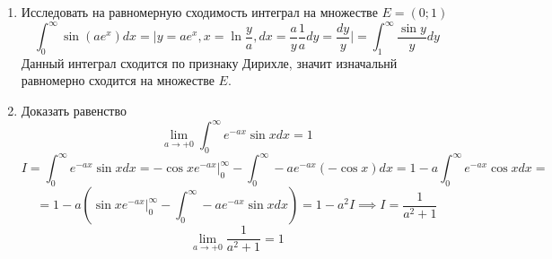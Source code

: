 \documentclass{article}
\begin{document}
\begin{large}
\begin{enumerate}
\item Исследовать на равномерную сходимость интеграл на множестве $ E = (0; 1)$
$$ \int_0^\infty \sin (ae^x) dx = \Big| y = ae^x, x = \ln \frac{y}{a}, dx = \frac{a}{y} \frac{1}{a} dy = \frac{dy}{y} \Big| = \int_1^\infty \frac{\sin y}{y} dy $$
Данный интеграл сходится по признаку Дирихле, значит изначальнй равномерно сходится на множестве $E$.

\item Доказать равенство
$$ \lim_{a \to +0} \int_0^\infty e^{-ax} \sin x dx = 1 $$
$$ I = \int_0^\infty e^{-ax} \sin x dx = -\cos x e^{-ax} \Big|_0^\infty - \int_0^\infty -a e^{-ax} (-\cos x) dx = 1 - a\int_0^\infty e^{-ax} \cos x dx = $$
$$ = 1 - a \left(\sin x e^{-ax} \Big|_0^\infty - \int_0^\infty -a e^{-ax} \sin x dx \right) = 1 - a^2 I \implies I = \frac{1}{a^2 + 1}  $$
$$ \lim_{a \to +0} \frac{1}{a^2+1} = 1 $$


\end{enumerate}
\end{large}
\end{document}
